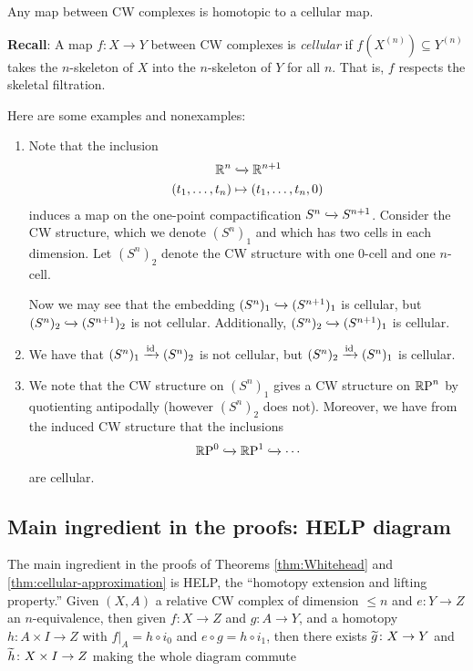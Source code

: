\documentclass{article}[11pt]
\begin{document}
\begin{corollary} Any map between CW complexes is homotopic to a cellular map.
\end{corollary}

\textbf{Recall}: A map $f:X\to Y$ between CW complexes is \textit{cellular} if $f(X^{(n)}) \subseteq Y^{(n)}$ takes the $n$-skeleton of $X$ into the $n$-skeleton of $Y$ for all $n$. That is, $f$ respects the skeletal filtration.

\begin{examples} Here are some examples and nonexamples:
\begin{enumerate}
	\item Note that the inclusion
	\begin{align*}
		\mathbb{R}^n &\xhookrightarrow{} \mathbb{R}^{n+1} \\
		(t_1,\ldots,t_n) &\mapsto (t_1,\ldots,t_n,0)
	\end{align*}
	induces a map on the one-point compactification $S^n \xhookrightarrow{} S^{n+1}$. Consider the CW structure, which we denote $(S^n)_1$ and which has two cells in each dimension. Let $(S^n)_2$ denote the CW structure with one 0-cell and one $n$-cell. %

	Now we may see that the embedding $(S^n)_1 \xhookrightarrow{} (S^{n+1})_1$ is cellular, but $(S^n)_2 \xhookrightarrow{} (S^{n+1})_2$ is not cellular. Additionally, $(S^n)_2 \xhookrightarrow{} (S^{n+1})_1$ is cellular.

	\item We have that $(S^n)_1 \xrightarrow{\text{id}} (S^n)_2$ is not cellular, but $(S^n)_2 \xrightarrow{\text{id}} (S^n)_1$ is cellular.

	\item We note that the CW structure on $(S^n)_1$ gives a CW structure on $\mathbb{R}\text{P}^n$ by quotienting antipodally (however $(S^n)_2$ does not). Moreover, we have from the induced CW structure that the inclusions
	\begin{align*}
		\mathbb{R}\text{P}^0 \xhookrightarrow{} \mathbb{R}\text{P}^1 \xhookrightarrow{} \cdots
	\end{align*}
	are cellular.
\end{enumerate}
\end{examples}

\subsection{Main ingredient in the proofs: HELP diagram}

The main ingredient in the proofs of  Theorems \ref{thm:Whitehead} and \ref{thm:cellular-approximation} is HELP, the ``homotopy extension and lifting property.'' Given $(X,A)$ a relative CW complex of dimension $\leq n$ and $e: Y \to Z$ an $n$-equivalence, then given $f\colon X\to Z$ and $g: A \to Y$, and a homotopy $h\colon A\times I \to Z$ with $\left. f \right|_A = h\circ i_0$ and $e\circ g = h\circ i_1$, then there exists $\widetilde{g}\colon X\to Y$ and $\widetilde{h}\colon X\times I \to Z$ making the whole diagram commute
\end{document}
